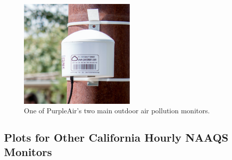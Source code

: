 \documentclass[12pt]{article}
\begin{document}
\begin{figure}[h!]
\centering
\includegraphics[width=0.5\textwidth]{appendix/sensor_pics/PA_outdoor_monitor.png}
\caption{One of PurpleAir's two main outdoor air pollution monitors.}
\label{fig:pic-ps-sensor}
\end{figure}

\FloatBarrier
\newpage
\subsection{Plots for Other California Hourly NAAQS Monitors} \label{app-additional-plots}



% 
\end{document}
